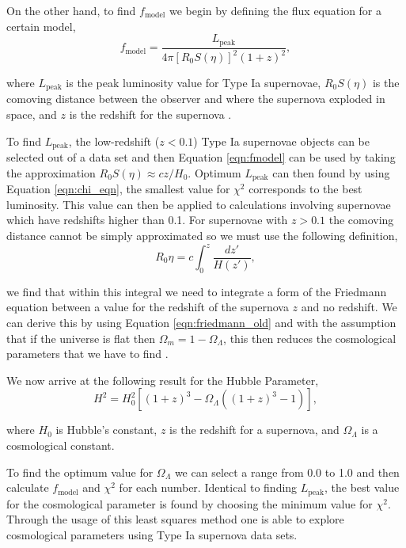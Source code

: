 \documentclass[twocolumn]{revtex4}
\begin{document}
On the other hand, to find $f_\text{model}$ we begin by defining the flux equation for a certain model,
\begin{equation}
f_\text{model}=\frac{L_\text{peak}}{4\pi [R_0 S(\eta)]^2 (1+z)^2},
\label{eqn:fmodel}
\end{equation}

where $L_\text{peak}$ is the peak luminosity value for Type Ia supernovae, $R_0 S(\eta)$ is the comoving distance between the observer and where the supernova exploded in space, and $z$ is the redshift for the supernova \cite{script}.

To find $L_\text{peak}$, the low-redshift ($z<0.1$) Type Ia supernovae objects can be selected out of a data set and then Equation \ref{eqn:fmodel} can be used by taking the approximation $R_0 S(\eta) \approx cz/H_0$. Optimum $L_\text{peak}$ can then found by using Equation \ref{eqn:chi_eqn}, the smallest value for $\chi^2$ corresponds to the best luminosity. This value can then be applied to calculations involving supernovae which have redshifts higher than 0.1. For supernovae with $z>0.1$ the comoving distance cannot be simply approximated so we must use the following definition,
\begin{equation}
R_0 \eta = c \int_0^z \frac{dz'}{H(z')},
\label{eqn:comoving_integral}
\end{equation}

we find that within this integral we need to integrate a form of the Friedmann equation between a value for the redshift of the supernova $z$ and no redshift. We can derive this by using Equation \ref{eqn:friedmann_old} and with the assumption that if the universe is flat then $\Omega_m = 1 - \Omega_{\Lambda}$, this then reduces the cosmological parameters that we have to find \cite{script}. 

We now arrive at the following result for the Hubble Parameter,
\begin{equation}
H^2 = H_0^2 [(1+z)^3 - \Omega_{\Lambda} ((1+z)^3-1)],
\label{eqn:hubble_parameter}
\end{equation}

where $H_0$ is Hubble's constant, $z$ is the redshift for a supernova, and $\Omega_\Lambda$ is a cosmological constant.

To find the optimum value for $\Omega_\Lambda$ we can select a range from 0.0 to 1.0 and then calculate $f_\text{model}$ and $\chi^2$ for each number. Identical to finding $L_\text{peak}$, the best value for the cosmological parameter is found by choosing the minimum value for $\chi^2$. Through the usage of this least squares method one is able to explore cosmological parameters using Type Ia supernova data sets.
\end{document}
